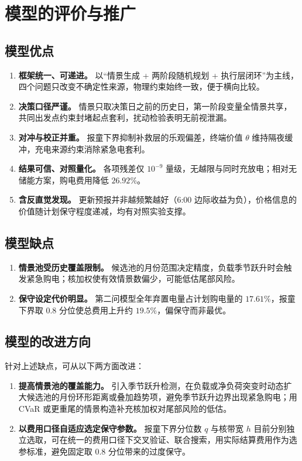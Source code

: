 \section{模型的评价与推广}

\subsection{模型优点}

\begin{enumerate}
  \item \textbf{框架统一、可递进。} 以“情景生成 + 两阶段随机规划 + 执行层闭环”为主线，四个问题只改变不确定性来源，物理约束始终一致，便于横向比较。
  \item \textbf{决策口径严谨。} 情景只取决策日之前的历史日，第一阶段变量全情景共享，共同出发点约束封堵起点套利，扰动检验表明无前视泄漏。
  \item \textbf{对冲与校正并重。} 报童下界抑制补救层的乐观偏差，终端价值 $\theta$ 维持隔夜缓冲，充电来源约束消除紧急电套利。
  \item \textbf{结果可信、对照量化。} 各项残差仅 $10^{-9}$ 量级，无越限与同时充放电；相对无储能方案，购电费用降低 $26.92\%$。
  \item \textbf{含反直觉发现。} 更新预报并非越频繁越好（6:00 边际收益为负），价格信息的价值随计划保守程度递减，均有对照实验支撑。
\end{enumerate}

\subsection{模型缺点}

\begin{enumerate}
  \item \textbf{情景池受历史覆盖限制。} 候选池的月份范围决定精度，负载季节跃升时会触发紧急购电；核加权使有效情景数偏少，可能低估尾部风险。
  \item \textbf{保守设定代价明显。} 第二问模型全年弃置电量占计划购电量的 $17.61\%$，报童下界取 $0.8$ 分位使总费用上升约 $19.5\%$，偏保守而非最优。
\end{enumerate}

\subsection{模型的改进方向}

针对上述缺点，可从以下两方面改进：

\begin{enumerate}
  \item \textbf{提高情景池的覆盖能力。} 引入季节跃升检测，在负载或净负荷突变时动态扩大候选池的月份环形距离或叠加趋势项，避免季节跃升边界出现紧急购电；用 CVaR 或更重尾的情景构造补充核加权对尾部风险的低估。
  \item \textbf{以费用口径自适应选定保守参数。} 报童下界分位数 $q$ 与核带宽 $h$ 目前分别独立选取，可在统一的费用口径下交叉验证、联合搜索，用实际结算费用作为选参标准，避免固定取 $0.8$ 分位带来的过度保守。
\end{enumerate}

